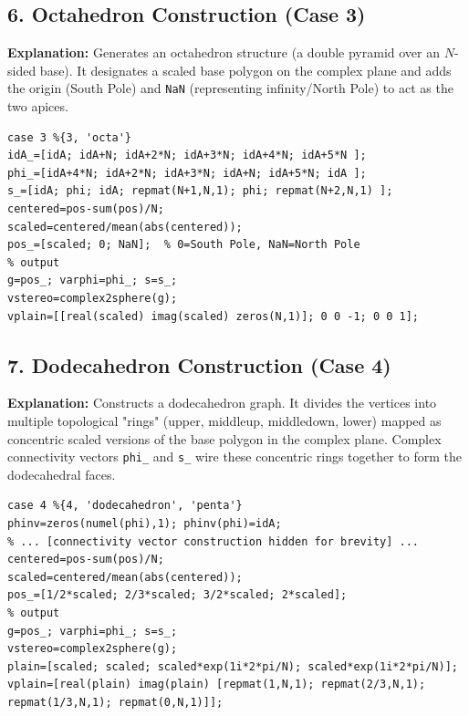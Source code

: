 \subsection{6. Octahedron Construction (Case 3)}
\textbf{Explanation:} 
Generates an octahedron structure (a double pyramid over an $N$-sided base). It designates a scaled base polygon on the complex plane and adds the origin (South Pole) and \texttt{NaN} (representing infinity/North Pole) to act as the two apices. 

\begin{lstlisting}
case 3 %{3, 'octa'}
idA_=[idA; idA+N; idA+2*N; idA+3*N; idA+4*N; idA+5*N ];
phi_=[idA+4*N; idA+2*N; idA+3*N; idA+N; idA+5*N; idA ];
s_=[idA; phi; idA; repmat(N+1,N,1); phi; repmat(N+2,N,1) ];
centered=pos-sum(pos)/N; 
scaled=centered/mean(abs(centered)); 
pos_=[scaled; 0; NaN];  % 0=South Pole, NaN=North Pole
% output
g=pos_; varphi=phi_; s=s_;
vstereo=complex2sphere(g); 
vplain=[[real(scaled) imag(scaled) zeros(N,1)]; 0 0 -1; 0 0 1];
\end{lstlisting}

\subsection{7. Dodecahedron Construction (Case 4)}
\textbf{Explanation:} 
Constructs a dodecahedron graph. It divides the vertices into multiple topological "rings" (upper, middleup, middledown, lower) mapped as concentric scaled versions of the base polygon in the complex plane. Complex connectivity vectors \texttt{phi\_} and \texttt{s\_} wire these concentric rings together to form the dodecahedral faces.

\begin{lstlisting}
case 4 %{4, 'dodecahedron', 'penta'}
phinv=zeros(numel(phi),1); phinv(phi)=idA;
% ... [connectivity vector construction hidden for brevity] ...
centered=pos-sum(pos)/N; 
scaled=centered/mean(abs(centered)); 
pos_=[1/2*scaled; 2/3*scaled; 3/2*scaled; 2*scaled]; 
% output
g=pos_; varphi=phi_; s=s_;
vstereo=complex2sphere(g); 
plain=[scaled; scaled; scaled*exp(1i*2*pi/N); scaled*exp(1i*2*pi/N)]; 
vplain=[real(plain) imag(plain) [repmat(1,N,1); repmat(2/3,N,1); repmat(1/3,N,1); repmat(0,N,1)]];
\end{lstlisting}

